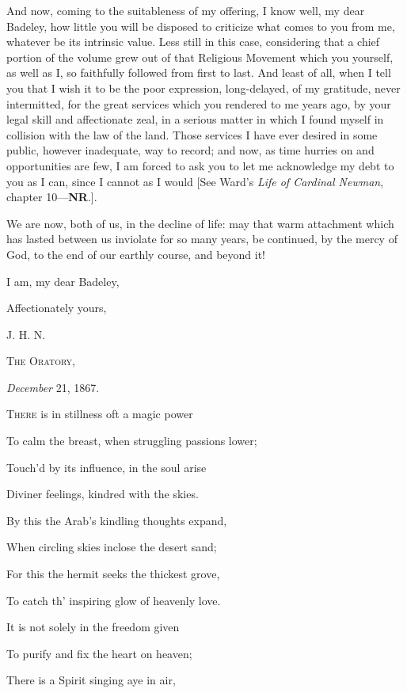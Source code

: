And now, coming to the suitableness of my offering, I know well, my
dear Badeley, how little you will be disposed to criticize what comes
to you from me, whatever be its intrinsic value. Less still in this
case, considering that a chief portion of the volume grew out of that
Religious Movement which you yourself, as well as I, so faithfully
followed from first to last. And least of all, when I tell you that I
wish it to be the poor expression, long-delayed, of my gratitude,
never intermitted, for the great services which you rendered to me
years ago, by your legal skill and affectionate zeal, in a serious
matter in which I found myself in collision with the law of the land.
Those services I have ever desired in some public, however inadequate,
way to record; and now, as time hurries on and opportunities are few,
I am forced to ask you to let me acknowledge my debt to you as I can,
since I cannot as I would [See Ward's \emph{Life of Cardinal Newman}, chapter
10—\textbf{NR}.].


We are now, both of us, in the decline of life: may that warm
attachment which has lasted between us inviolate for so many years, be
continued, by the mercy of God, to the end of our earthly course, and
beyond it!


I am, my dear Badeley,

Affectionately yours,

J. H. N.


T\textsc{he} O\textsc{ratory},

\emph{December} 21, 1867.


T\textsc{here} is in stillness oft a magic power

To calm the breast, when struggling passions lower;

Touch'd by its influence, in the soul arise

Diviner feelings, kindred with the skies.

By this the Arab's kindling thoughts expand,

When circling skies inclose the desert sand;

For this the hermit seeks the thickest grove,

To catch th' inspiring glow of heavenly love.

It is not solely in the freedom given

To purify and fix the heart on heaven;

There is a Spirit singing aye in air,

